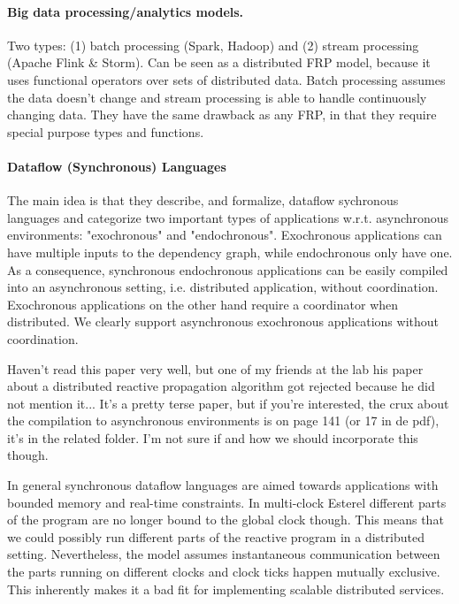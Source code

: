 {%
\paragraph{Big data processing/analytics models.} Two types: (1) batch processing (Spark, Hadoop) \cite{mapreduce} and (2) stream processing (Apache Flink \& Storm). Can be seen as a  distributed FRP model, because it uses functional operators over sets of distributed data. Batch processing assumes the data doesn't change and stream processing is able to handle continuously changing data. They have the same drawback as any FRP, in that they require special purpose types and functions.


\paragraph{Dataflow (Synchronous) Languages}
\cite{syncdataflow}
The main idea is that they describe, and formalize, dataflow sychronous languages and categorize two important types of applications w.r.t. asynchronous environments: "exochronous" and "endochronous". Exochronous applications can have multiple inputs to the dependency graph, while endochronous only have one. As a consequence, synchronous endochronous applications can be easily compiled into an asynchronous setting, i.e. distributed application, without coordination. Exochronous applications on the other hand require a coordinator when distributed. \newline
We clearly support asynchronous exochronous applications without coordination.

Haven't read this paper very well, but one of my friends at the lab his paper about a distributed reactive propagation algorithm got rejected because he did not mention it...
It's a pretty terse paper, but if you're interested, the crux about the compilation to asynchronous environments is on page 141 (or 17 in de pdf), it's in the related folder. I'm not sure if and how we should incorporate this though. \newline


\cite{lustre}\cite{signal} In general synchronous dataflow languages are aimed towards applications with bounded memory and real-time constraints. In multi-clock Esterel\cite{esterel} different parts of the program are no longer bound to the global clock though. This means that we could possibly run different parts of the reactive program in a distributed setting. Nevertheless, the model assumes instantaneous communication between the parts running on different clocks and clock ticks happen mutually exclusive. This inherently makes it a bad fit for implementing scalable distributed services.


\cite{orleans}
}

